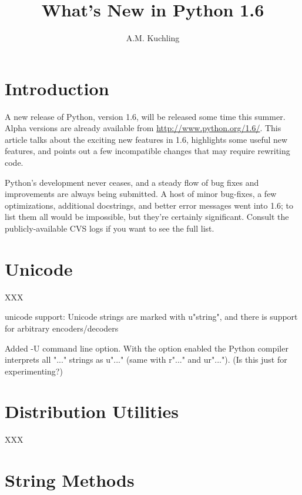 \documentclass{howto}
\title{What's New in Python 1.6}
\author{A.M. Kuchling}
\begin{document}
\maketitle\tableofcontents

\section{Introduction}

A new release of Python, version 1.6, will be released some time this
summer.  Alpha versions are already available from
\url{http://www.python.org/1.6/}.  This article talks about the
exciting new features in 1.6, highlights some useful new features, and
points out a few incompatible changes that may require rewriting code.

Python's development never ceases, and a steady flow of bug fixes and
improvements are always being submitted.  A host of minor bug-fixes, a
few optimizations, additional docstrings, and better error messages
went into 1.6; to list them all would be impossible, but they're
certainly significant.  Consult the publicly-available CVS logs if you
want to see the full list.

\section{Unicode}

XXX

unicode support: Unicode strings are marked with u"string", and there
is support for arbitrary encoders/decoders

Added -U command line option.  With the option enabled the Python
compiler interprets all "..."  strings as u"..." (same with r"..." and
ur"...").  (Is this just for experimenting?)


\section{Distribution Utilities}

XXX

\section{String Methods}

\end{document}
